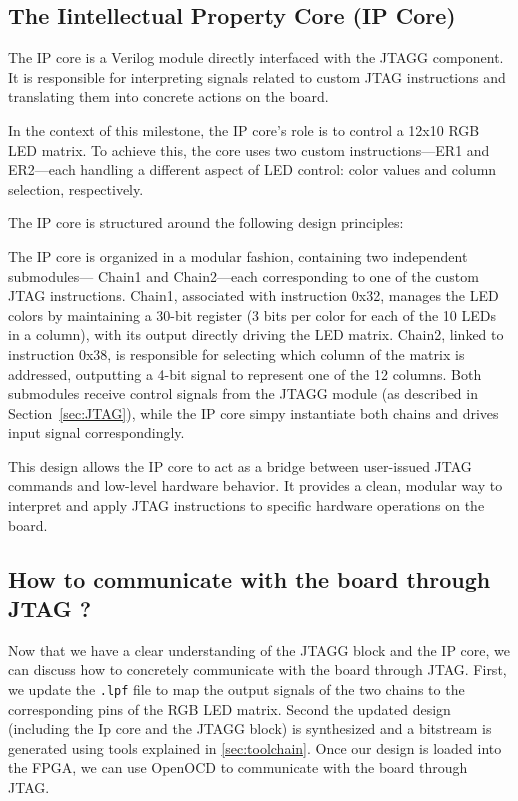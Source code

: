 \documentclass[a4paper,11pt,oneside]{report}
\begin{document}
\subsection{The Iintellectual Property Core (IP Core)}

The IP core is a Verilog module directly interfaced with the JTAGG component. 
It is responsible for interpreting signals related to custom JTAG instructions and translating them into concrete actions on the board.

In the context of this milestone, the IP core’s role is to control a 12x10 RGB LED matrix.
To achieve this, the core uses two custom instructions—ER1 and ER2—each handling a different aspect of LED control: color values and column selection, respectively.

The IP core is structured around the following design principles:

The IP core is organized in a modular fashion, containing two independent submodules—
Chain1 and Chain2—each corresponding to one of the custom JTAG instructions. Chain1,
associated with instruction 0x32, manages the LED colors by maintaining a 30-bit register
(3 bits per color for each of the 10 LEDs in a column), with its output directly driving the
LED matrix. Chain2, linked to instruction 0x38, is responsible for selecting which column
of the matrix is addressed, outputting a 4-bit signal to represent one of the 12 columns.
Both submodules receive control signals from the JTAGG module (as described in
Section~\ref{sec:JTAG}), while the IP core simpy instantiate both chains and drives input signal correspondingly.

This design allows the IP core to act as a bridge between user-issued JTAG commands and
low-level hardware behavior. It provides a clean, modular way to interpret and apply JTAG
instructions to specific hardware operations on the board.

\subsection{How to communicate with the board through JTAG ?} 

Now that we have a clear understanding of the JTAGG block and the IP core, we can discuss how to concretely communicate with the board through JTAG.
First, we update the \texttt{.lpf} file to map the output signals of the two chains to the corresponding pins of the RGB LED matrix.
Second the updated design (including the Ip core and the JTAGG block) is synthesized and a bitstream is generated using tools explained in \ref{sec:toolchain}.
Once our design is loaded into the FPGA, we can use OpenOCD to communicate with the board through JTAG.
\end{document}
